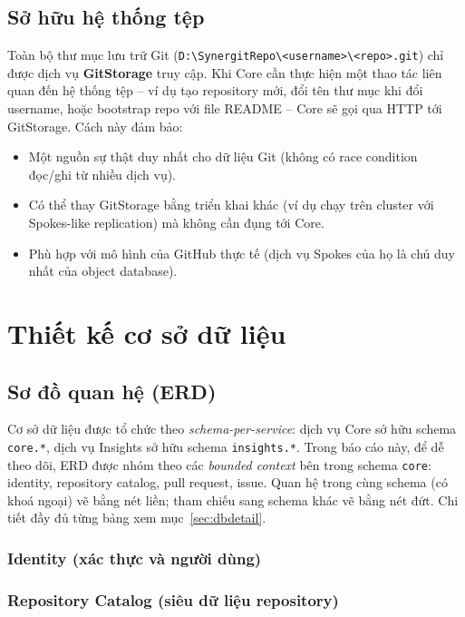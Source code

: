 

\subsection{Sở hữu hệ thống tệp}
Toàn bộ thư mục lưu trữ Git (\texttt{D:\textbackslash SynergitRepo\textbackslash<username>\textbackslash<repo>.git}) chỉ được dịch vụ \textbf{GitStorage} truy cập. Khi Core cần thực hiện một thao tác liên quan đến hệ thống tệp -- ví dụ tạo repository mới, đổi tên thư mục khi đổi username, hoặc bootstrap repo với file README -- Core sẽ gọi qua HTTP tới GitStorage. Cách này đảm bảo:

\begin{itemize}
\item Một nguồn sự thật duy nhất cho dữ liệu Git (không có race condition đọc/ghi từ nhiều dịch vụ).
\item Có thể thay GitStorage bằng triển khai khác (ví dụ chạy trên cluster với Spokes-like replication) mà không cần đụng tới Core.
\item Phù hợp với mô hình của GitHub thực tế (dịch vụ Spokes của họ là chủ duy nhất của object database).
\end{itemize}

\section{Thiết kế cơ sở dữ liệu}

\subsection{Sơ đồ quan hệ (ERD)}
Cơ sở dữ liệu được tổ chức theo \textit{schema-per-service}: dịch vụ Core sở hữu schema \texttt{core.*}, dịch vụ Insights sở hữu schema \texttt{insights.*}. Trong báo cáo này, để dễ theo dõi, ERD được nhóm theo các \textit{bounded context} bên trong schema \texttt{core}: identity, repository catalog, pull request, issue. Quan hệ trong cùng schema (có khoá ngoại) vẽ bằng nét liền; tham chiếu sang schema khác vẽ bằng nét đứt. Chi tiết đầy đủ từng bảng xem mục~\ref{sec:dbdetail}.

\subsubsection{Identity (xác thực và người dùng)}


\subsubsection{Repository Catalog (siêu dữ liệu repository)}


